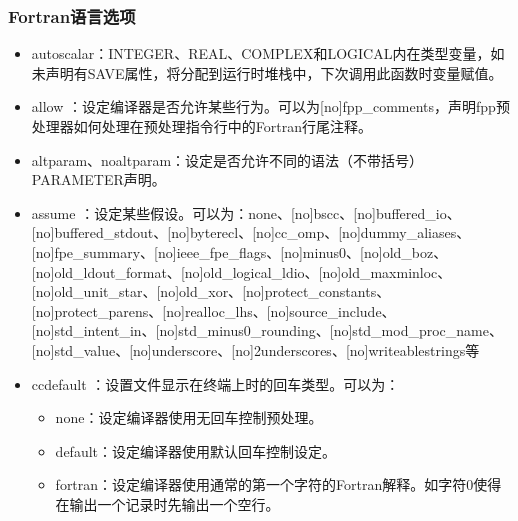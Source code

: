 \documentclass[a4paper,12pt,english]{sphinxmanual}
\begin{document}
\subsubsection{Fortran语言选项}
\label{\detokenize{compiler/intel:id10}}\begin{itemize}
\item {} 
\sphinxAtStartPar
\sphinxhyphen{}auto\sphinxhyphen{}scalar：INTEGER、REAL、COMPLEX和LOGICAL内在类型变量，如未声明有SAVE属性，将分配到运行时堆栈中，下次调用此函数时变量赋值。

\item {} 
\sphinxAtStartPar
\sphinxhyphen{}allow
：设定编译器是否允许某些行为。可以为{[}no{]}fpp\_comments，声明fpp预处理器如何处理在预处理指令行中的Fortran行尾注释。

\item {} 
\sphinxAtStartPar
\sphinxhyphen{}altparam、\sphinxhyphen{}noaltparam：设定是否允许不同的语法（不带括号）PARAMETER声明。

\item {} 
\sphinxAtStartPar
\sphinxhyphen{}assume ：设定某些假设。可以为：none、{[}no{]}bscc、{[}no{]}buffered\_io、{[}no{]}buffered\_stdout、{[}no{]}byterecl、{[}no{]}cc\_omp、{[}no{]}dummy\_aliases、{[}no{]}fpe\_summary、{[}no{]}ieee\_fpe\_flags、{[}no{]}minus0、{[}no{]}old\_boz、{[}no{]}old\_ldout\_format、{[}no{]}old\_logical\_ldio、{[}no{]}old\_maxminloc、{[}no{]}old\_unit\_star、{[}no{]}old\_xor、{[}no{]}protect\_constants、{[}no{]}protect\_parens、{[}no{]}realloc\_lhs、{[}no{]}source\_include、{[}no{]}std\_intent\_in、{[}no{]}std\_minus0\_rounding、{[}no{]}std\_mod\_proc\_name、{[}no{]}std\_value、{[}no{]}underscore、{[}no{]}2underscores、{[}no{]}writeable\sphinxhyphen{}strings等

\item {} 
\sphinxAtStartPar
\sphinxhyphen{}ccdefault ：设置文件显示在终端上时的回车类型。可以为：
\begin{itemize}
\item {} 
\sphinxAtStartPar
none：设定编译器使用无回车控制预处理。

\item {} 
\sphinxAtStartPar
default：设定编译器使用默认回车控制设定。

\item {} 
\sphinxAtStartPar
fortran：设定编译器使用通常的第一个字符的Fortran解释。如字符0使得在输出一个记录时先输出一个空行。


\end{itemize}
\end{itemize}
\end{document}
